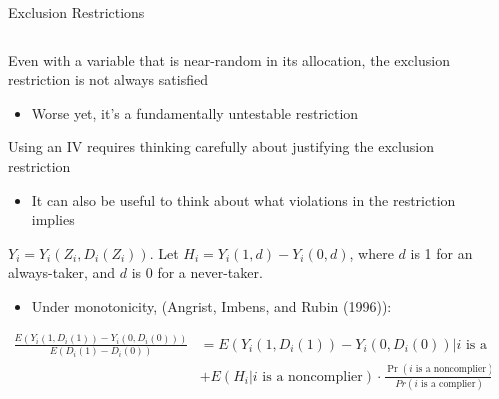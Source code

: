 \documentclass[notes,11pt, aspectratio=169]{beamer}
\newenvironment{wideitemize}{\itemize\addtolength{\itemsep}{10pt}}{\enditemize}
\begin{document}
\begin{frame}{Exclusion Restrictions}
  \begin{columns}[T] %
    \begin{column}{0.85\textwidth}
      \begin{wideitemize}
      \item Even with a variable that is near-random in its
        allocation, the exclusion restriction is not always satisfied
        \begin{itemize}
        \item Worse yet, it's a fundamentally untestable restriction
        \end{itemize}
      \item Using an IV requires thinking carefully about justifying
        the exclusion restriction
        \begin{itemize}
      \item It can also be useful to think about what
          violations in the restriction implies
        \end{itemize}
      \item $Y_{i} = Y_{i}(Z_{i}, D_{i}(Z_{i}))$. Let
        $H_{i} = Y_{i}(1,d) - Y_{i}(0,d)$, where $d$ is 1 for an
        always-taker, and $d$ is 0 for a never-taker.
        \begin{itemize}
      \item Under monotonicity, (Angrist, Imbens, and Rubin (1996)):
        \end{itemize}
          \begin{align*}
            \frac{E(Y_{i}(1, D_{i}(1)) - Y_{i}(0, D_{i}(0)))}{E(D_{i}(1) - D_{i}(0))} &= E(Y_{i}(1, D_{i}(1)) -  Y_{i}(0, D_{i}(0)) | \text{$i$ is a complier})\\
            &+ E(H_{i} | \text{$i$ is a noncomplier}) \cdot \frac{\Pr(\text{$i$ is a noncomplier})}{Pr(\text{$i$ is a complier})}
          \end{align*}
      \end{wideitemize}
\end{column}
\begin{column}{0.4\textwidth}
\end{column}
\end{columns}
\end{frame}
\end{document}
